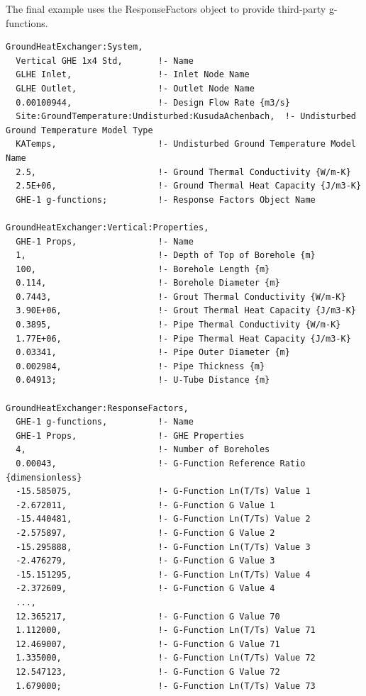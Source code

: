The final example uses the ResponseFactors object to provide third-party g-functions.

\begin{lstlisting}
GroundHeatExchanger:System,
  Vertical GHE 1x4 Std,       !- Name
  GLHE Inlet,                 !- Inlet Node Name
  GLHE Outlet,                !- Outlet Node Name
  0.00100944,                 !- Design Flow Rate {m3/s}
  Site:GroundTemperature:Undisturbed:KusudaAchenbach,  !- Undisturbed Ground Temperature Model Type
  KATemps,                    !- Undisturbed Ground Temperature Model Name
  2.5,                        !- Ground Thermal Conductivity {W/m-K}
  2.5E+06,                    !- Ground Thermal Heat Capacity {J/m3-K}
  GHE-1 g-functions;          !- Response Factors Object Name

GroundHeatExchanger:Vertical:Properties,
  GHE-1 Props,                !- Name
  1,                          !- Depth of Top of Borehole {m}
  100,                        !- Borehole Length {m}
  0.114,                      !- Borehole Diameter {m}
  0.7443,                     !- Grout Thermal Conductivity {W/m-K}
  3.90E+06,                   !- Grout Thermal Heat Capacity {J/m3-K}
  0.3895,                     !- Pipe Thermal Conductivity {W/m-K}
  1.77E+06,                   !- Pipe Thermal Heat Capacity {J/m3-K}
  0.03341,                    !- Pipe Outer Diameter {m}
  0.002984,                   !- Pipe Thickness {m}
  0.04913;                    !- U-Tube Distance {m}

GroundHeatExchanger:ResponseFactors,
  GHE-1 g-functions,          !- Name
  GHE-1 Props,                !- GHE Properties
  4,                          !- Number of Boreholes
  0.00043,                    !- G-Function Reference Ratio {dimensionless}
  -15.585075,                 !- G-Function Ln(T/Ts) Value 1
  -2.672011,                  !- G-Function G Value 1
  -15.440481,                 !- G-Function Ln(T/Ts) Value 2
  -2.575897,                  !- G-Function G Value 2
  -15.295888,                 !- G-Function Ln(T/Ts) Value 3
  -2.476279,                  !- G-Function G Value 3
  -15.151295,                 !- G-Function Ln(T/Ts) Value 4
  -2.372609,                  !- G-Function G Value 4
  ...,
  12.365217,                  !- G-Function G Value 70
  1.112000,                   !- G-Function Ln(T/Ts) Value 71
  12.469007,                  !- G-Function G Value 71
  1.335000,                   !- G-Function Ln(T/Ts) Value 72
  12.547123,                  !- G-Function G Value 72
  1.679000;                   !- G-Function Ln(T/Ts) Value 73
\end{lstlisting}

